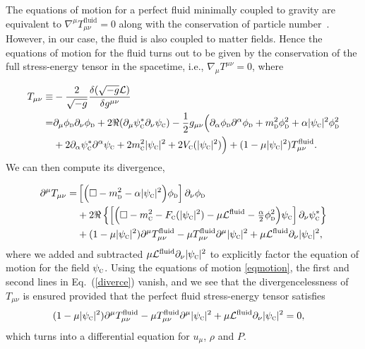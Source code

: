 \documentclass[letterpaper,12pt,titlepage,oneside,final]{book}
\newcommand{\tc}[1]{\textsc{#1}}
\begin{document}
The equations of motion for a perfect fluid minimally coupled to gravity are equivalent to $\nabla^\mu T_{\mu\nu}^{\textrm{fluid}}=0$ along with the conservation of particle number~\cite{Schutz1970}. However, in our case, the fluid is also coupled to matter fields. Hence the equations of motion for the fluid turns out to be given by the conservation of the full stress-energy tensor in the spacetime, i.e.,  $\nabla_\mu T^{\mu\nu}=0$, where %

\begin{equation}
\begin{aligned}\label{eq:fullTmunu}
    T_{\mu\nu} \equiv& - \frac{2}{\sqrt{-g}} \frac{\delta (\sqrt{-g}\mathcal{L})}{\delta g^{\mu\nu}}\\
    =& \partial_\mu \phi_{\tc{d}}\partial_\nu \phi_{\tc{d}}+2\Re(\partial_\mu \psi_{\tc{c}}^*\partial_\nu \psi_{\tc{c}}) -\frac{1}{2}g_{\mu\nu}\Big(\partial_\alpha \phi_{\tc{d}}\partial^\alpha \phi_{\tc{d}} + m_{\tc{d}}^2 \phi_\tc{d}^2 + \alpha |\psi_\tc{c}|^2 \phi_\tc{d}^2\\
    &+ 2\partial_\alpha \psi_{\tc{c}}^*\partial^\alpha \psi_{\tc{c}} + 2m_{\tc{c}}^2 |\psi_\tc{c}|^2 + 2 V_\tc{c}(|\psi_\tc{c}|^2)\Big)+(1-\mu |\psi_\tc{c}|^2)T^\textrm{fluid}_{\mu\nu}.
\end{aligned}
\end{equation}
We can then compute its divergence,

\begin{equation}
\begin{aligned}
    \partial^\mu T_{\mu\nu} =&  \left[\Big(\Box-m_\tc{d}^2 - \alpha|\psi_\tc{c}|^2 \Big)\phi_{\tc{d}}\right]\partial_\nu \phi_{\tc{d}} \\&+2\Re\left\{\left[\Big(\Box-m_\tc{c}^2  -F_\tc{c}(|\psi_\tc{c}|^2)- \mu  \mathcal{L}^\textrm{fluid}- \tfrac{\alpha}{2}\phi_\tc{d}^2\Big)\psi_{\tc{c}}\right]\partial_\nu \psi_{\tc{c}}^*\right\}
    \\&+ (1-\mu|\psi_\tc{c}|^2) \partial^\mu T^\textrm{fluid}_{\mu\nu} -\mu T^\textrm{fluid}_{\mu\nu} \partial^\mu |\psi_\tc{c}|^2 + \mu  \mathcal{L}^\textrm{fluid} \partial_\nu|\psi_\tc{c}|^2,
\end{aligned}
\label{diverce}
\end{equation}
where we added and subtracted $ \mu  \mathcal{L}^\textrm{fluid} \partial_\nu|\psi_\tc{c}|^2$ to explicitly factor the equation of motion for the field $\psi_\tc{c}$. Using the equations of motion \eqref{eqmotion}, the first and second lines in Eq.~(\ref{diverce}) vanish, and we see that the divergencelessness of $T_{\mu\nu}$ is ensured provided that the perfect fluid stress-energy tensor satisfies
\begin{equation}\label{eq:Tmunurequirement}
\begin{aligned}
    (1-\mu|\psi_\tc{c}|^2) \partial^\mu T^\textrm{fluid}_{\mu\nu} &-\mu T^\textrm{fluid}_{\mu\nu} \partial^\mu |\psi_\tc{c}|^2 + \mu  \mathcal{L}^{\textrm{fluid}} \partial_\nu|\psi_\tc{c}|^2 = 0,
\end{aligned}\end{equation}
which turns into a differential equation for $u_\mu$, $\rho$ and $P$.
\end{document}
